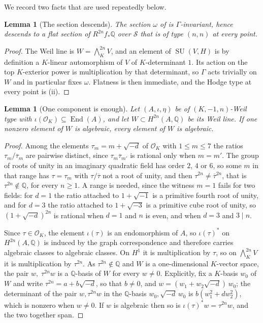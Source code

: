 \documentclass[11pt,reqno]{amsart}
\theoremstyle{plain}
\newtheorem{lemma}[theorem]{Lemma}
\theoremstyle{definition}
\theoremstyle{remark}
\newcommand{\QQ}{\mathbb{Q}}
\newcommand{\cO}{\mathcal{O}}
\newcommand{\cS}{\mathcal{S}}
\newcommand{\HW}{W}                      %
\DeclareMathOperator{\End}{End}
\DeclareMathOperator{\SU}{SU}
\newcommand{\bbar}[1]{\overline{#1}}
\begin{document}
We record two facts that are used repeatedly below.

\begin{lemma}[The section descends]\label{lem:omegadescends}
The section $\omega$ of  is $\Gamma$-invariant, hence
descends to a flat section of $R^{2n}f_{*}\QQ$ over $\cS$ that is of type
$(n,n)$ at every point.
\end{lemma}

\begin{proof}
The Weil line is $\HW=\bigwedge^{2n}_{K}V$, and an element of $\SU(V,H)$ is by
definition a $K$-linear automorphism of $V$ of $K$-determinant $1$. Its action
on the top $K$-exterior power is multiplication by that determinant, so
$\Gamma$ acts trivially on $\HW$ and in particular fixes $\omega$. Flatness is
then immediate, and the Hodge type at every point is
(ii).
\end{proof}

\begin{lemma}[One component is enough]\label{lem:onecomponent}
Let $(A,\iota,\eta)$ be of $(K,-1,n)$-Weil type with
$\iota(\cO_{K})\subseteq\End(A)$, and let $\HW\subset H^{2n}(A,\QQ)$ be its
Weil line. If one nonzero element of $\HW$ is algebraic, every element of
$\HW$ is algebraic.
\end{lemma}

\begin{proof}
Among the elements $\tau_{m}=m+\sqrt{-d}$ of $\cO_{K}$ with $1\le m\le7$ the
ratios $\tau_{m}/\bbar{\tau}_{m}$ are pairwise distinct, since
$\tau_{m}\bbar{\tau}_{m'}$ is rational only when $m=m'$. The group of roots of
unity in an imaginary quadratic field has order $2$, $4$ or $6$, so some $m$
in that range has $\tau=\tau_{m}$ with $\tau/\bbar\tau$ not a root of unity,
and then $\tau^{2n}\ne\bbar{\tau}^{2n}$, that is $\tau^{2n}\notin\QQ$, for
every $n\ge1$. A range is needed, since the witness $m=1$ fails for two
fields: for $d=1$ the ratio attached to $1+\sqrt{-1}$ is a primitive fourth
root of unity, and for $d=3$ the ratio attached to $1+\sqrt{-3}$ is a
primitive cube root of unity, so $(1+\sqrt{-d})^{2n}$ is rational when $d=1$
and $n$ is even, and when $d=3$ and $3\mid n$.

Since $\tau\in\cO_{K}$, the element $\iota(\tau)$ is an endomorphism of $A$,
so $\iota(\tau)^{*}$ on $H^{2n}(A,\QQ)$ is induced by the graph
correspondence and therefore carries algebraic classes to algebraic classes.
On $H^{1}$ it is multiplication by $\tau$, so on
$\bigwedge^{2n}_{K}V$ it is multiplication by $\tau^{2n}$. As
$\tau^{2n}\notin\QQ$ and $\HW$ is a one-dimensional $K$-vector space, the pair
$w,\;\tau^{2n}w$ is a $\QQ$-basis of $\HW$ for every $w\ne0$. Explicitly, fix
a $K$-basis $w_{0}$ of $\HW$ and write $\tau^{2n}=a+b\sqrt{-d}$, so that
$b\ne0$, and $w=(w_{1}+w_{2}\sqrt{-d})\,w_{0}$; the determinant of the pair
$w,\tau^{2n}w$ in the $\QQ$-basis $w_{0},\sqrt{-d}\,w_{0}$ is
$b(w_{1}^{2}+dw_{2}^{2})$, which is nonzero when $w\ne0$. If $w$ is
algebraic then so is $\iota(\tau)^{*}w=\tau^{2n}w$, and the two together span.
\end{proof}
\end{document}
